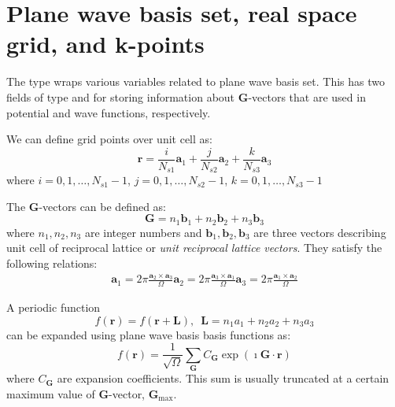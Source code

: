 \section{Plane wave basis set, real space grid, and k-points}

The type  wraps various variables related to plane wave basis
set. This has two fields of type 
and  for storing information about $\mathbf{G}$-vectors
that are used in potential and wave functions, respectively.



We can define grid points over unit cell as:
$$
\mathbf{r} = \frac{i}{N_{s1}}\mathbf{a}_{1} + \frac{j}{N_{s2}}\mathbf{a}_{2} +
\frac{k}{N_{s3}}\mathbf{a}_{3}
$$
where $i = 0,1,\ldots,N_{s1}-1$, $j = 0,1,\ldots,N_{s2}-1$, $k = 0,1,\ldots,N_{s3}-1$





The $\mathbf{G}$-vectors can be defined as:
\begin{equation}
\mathbf{G} = n_1 \mathbf{b}_1 + n_2 \mathbf{b}_2 + n_3 \mathbf{b}_3
\end{equation}
where $n_1, n_2, n_3$ are integer numbers and
$\mathbf{b}_1, \mathbf{b}_2, \mathbf{b}_3$ are three vectors describing
unit cell of reciprocal lattice or \textit{unit reciprocal lattice vectors}.
They satisfy the following relations:
\begin{align}
\mathbf{a}_1 = 2\pi\frac{\mathbf{a}_{2} \times \mathbf{a}_{3}}{\Omega}
\mathbf{a}_2 = 2\pi\frac{\mathbf{a}_{3} \times \mathbf{a}_{1}}{\Omega}
\mathbf{a}_3 = 2\pi\frac{\mathbf{a}_{1} \times \mathbf{a}_{2}}{\Omega}
\end{align}

A periodic function
\begin{equation}
f(\mathbf{r}) = f(\mathbf{r}+\mathbf{L}),\,\,\,
\mathbf{L} = n_{1}a_{1} + n_{2}a_{2} + n_{3}a_{3}
\end{equation}
can be expanded using plane wave basis basis functions as:
\begin{equation}
f(\mathbf{r}) = \frac{1}{\sqrt{\Omega}}\sum_{\mathbf{G}}
C_{\mathbf{G}} \exp(\imath \mathbf{G} \cdot \mathbf{r})
\end{equation}
where $C_{\mathbf{G}}$ are expansion coefficients. This sum is usually truncated
at a certain maximum value of $\mathbf{G}$-vector, $\mathbf{G}_{\mathrm{max}}$.

